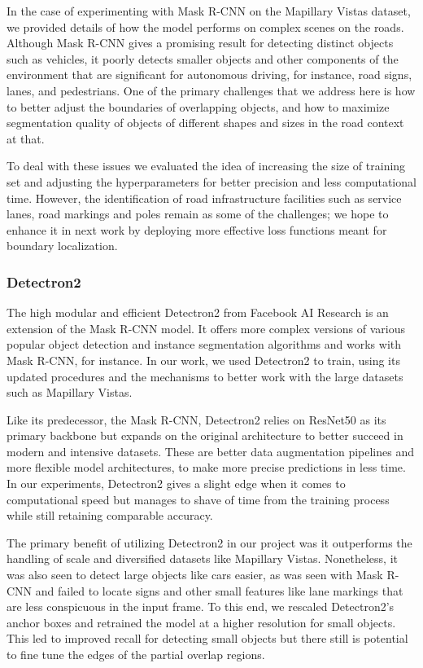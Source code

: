 \documentclass[conference]{IEEEtran}
\begin{document}
In the case of experimenting with Mask R-CNN on the Mapillary Vistas dataset, we provided details of how the model performs on complex scenes on the roads. Although Mask R-CNN gives a promising result for detecting distinct objects such as vehicles, it poorly detects smaller objects and other components of the environment that are significant for autonomous driving, for instance, road signs, lanes, and pedestrians. One of the primary challenges that we address here is how to better adjust the boundaries of overlapping objects, and how to maximize segmentation quality of objects of different shapes and sizes in the road context at that.

To deal with these issues we evaluated the idea of increasing the size of training set and adjusting the hyperparameters for better precision and less computational time. However, the identification of road infrastructure facilities such as service lanes, road markings and poles remain as some of the challenges; we hope to enhance it in next work by deploying more effective loss functions meant for boundary localization.
\\
\subsubsection{Detectron2}
The high modular and efficient Detectron2 from Facebook AI Research is an extension of the Mask R-CNN model. It offers more complex versions of various popular object detection and instance segmentation algorithms and works with Mask R-CNN, for instance. In our work, we used Detectron2 to train, using its updated procedures and the mechanisms to better work with the large datasets such as Mapillary Vistas.

Like its predecessor, the Mask R-CNN, Detectron2 relies on ResNet50 as its primary backbone but expands on the original architecture to better succeed in modern and intensive datasets. These are better data augmentation pipelines and more flexible model architectures, to make more precise predictions in less time. In our experiments, Detectron2 gives a slight edge when it comes to computational speed but manages to shave of time from the training process while still retaining comparable accuracy.

The primary benefit of utilizing Detectron2 in our project was it outperforms the handling of scale and diversified datasets like Mapillary Vistas. Nonetheless, it was also seen to detect large objects like cars easier, as was seen with Mask R-CNN and failed to locate signs and other small features like lane markings that are less conspicuous in the input frame. To this end, we rescaled Detectron2’s anchor boxes and retrained the model at a higher resolution for small objects. This led to improved recall for detecting small objects but there still is potential to fine tune the edges of the partial overlap regions.\\
\\
\\
\end{document}
